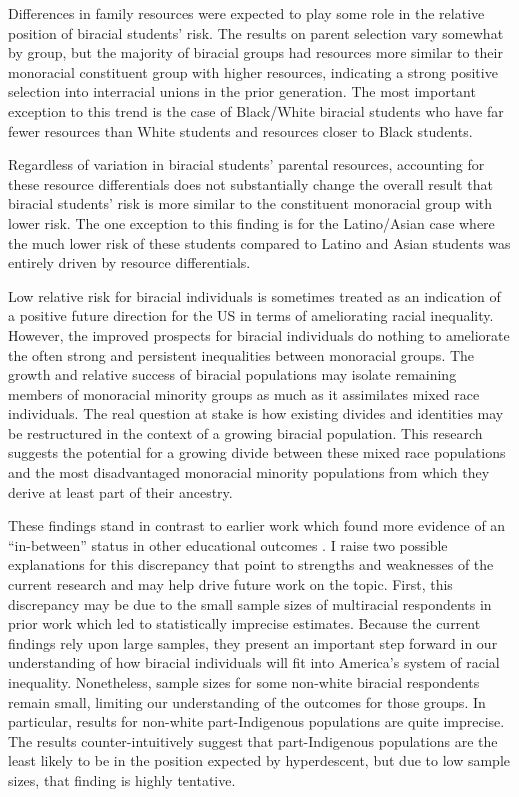 \documentclass[
  12pt,
  letterpaper,
]{article}
\begin{document}
Differences in family resources were expected to play some role in the
relative position of biracial students' risk. The results on parent
selection vary somewhat by group, but the majority of biracial groups
had resources more similar to their monoracial constituent group with
higher resources, indicating a strong positive selection into
interracial unions in the prior generation. The most important exception
to this trend is the case of Black/White biracial students who have far
fewer resources than White students and resources closer to Black
students.

Regardless of variation in biracial students' parental resources,
accounting for these resource differentials does not substantially
change the overall result that biracial students' risk is more similar
to the constituent monoracial group with lower risk. The one exception
to this finding is for the Latino/Asian case where the much lower risk
of these students compared to Latino and Asian students was entirely
driven by resource differentials.

Low relative risk for biracial individuals is sometimes treated as an
indication of a positive future direction for the US in terms of
ameliorating racial inequality. However, the improved prospects for
biracial individuals do nothing to ameliorate the often strong and
persistent inequalities between monoracial groups. The growth and
relative success of biracial populations may isolate remaining members
of monoracial minority groups as much as it assimilates mixed race
individuals. The real question at stake is how existing divides and
identities may be restructured in the context of a growing biracial
population. This research suggests the potential for a growing divide
between these mixed race populations and the most disadvantaged
monoracial minority populations from which they derive at least part of
their ancestry.

These findings stand in contrast to earlier work which found more
evidence of an ``in-between'' status in other educational outcomes
\autocite{herman_blackwhiteother_2009,campbell_multiracial_2009}. I
raise two possible explanations for this discrepancy that point to
strengths and weaknesses of the current research and may help drive
future work on the topic. First, this discrepancy may be due to the
small sample sizes of multiracial respondents in prior work which led to
statistically imprecise estimates. Because the current findings rely
upon large samples, they present an important step forward in our
understanding of how biracial individuals will fit into America's system
of racial inequality. Nonetheless, sample sizes for some non-white
biracial respondents remain small, limiting our understanding of the
outcomes for those groups. In particular, results for non-white
part-Indigenous populations are quite imprecise. The results
counter-intuitively suggest that part-Indigenous populations are the
least likely to be in the position expected by hyperdescent, but due to
low sample sizes, that finding is highly tentative.
\end{document}
